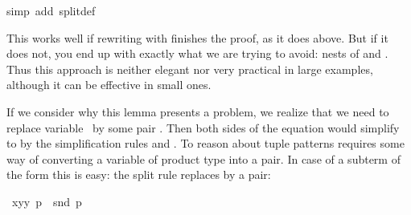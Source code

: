 \begin{isabellebody}
%
\endisadelimproof
%
\isatagproof
{}\isamarkupfalse%
{}simp\ add{}\ split{}def{}%
\endisatagproof
{\isafoldproof}%
%
\isadelimproof
%
\endisadelimproof
%
\begin{isamarkuptext}%
\noindent
This works well if rewriting with  finishes the
proof, as it does above.  But if it does not, you end up with exactly what
we are trying to avoid: nests of  and . Thus this
approach is neither elegant nor very practical in large examples, although it
can be effective in small ones.

If we consider why this lemma presents a problem, 
we realize that we need to replace variable~ by some pair .  Then both sides of the
equation would simplify to  by the simplification rules
 and .  
To reason about tuple patterns requires some way of
converting a variable of product type into a pair.
In case of a subterm of the form  this is easy: the split
rule  replaces  by a pair:%
%
\end{isamarkuptext}%
\isamarkuptrue%
\isamarkupfalse%
\ {}{}{}{}x{}y{}{}y{}\ p\ {}\ snd\ p{}\isanewline

\end{isabellebody}
